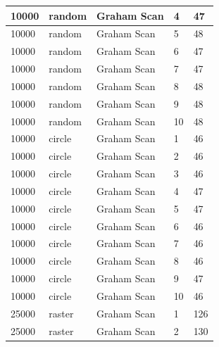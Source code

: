 \documentclass[12pt]{article}
\begin{document}
\begin{longtable}{|l|l|l|l|l|}
10000        & random            & Graham Scan & 4          & 47                            \\ \hline
10000        & random            & Graham Scan & 5          & 48                            \\ \hline
10000        & random            & Graham Scan & 6          & 47                            \\ \hline
10000        & random            & Graham Scan & 7          & 47                            \\ \hline
10000        & random            & Graham Scan & 8          & 48                            \\ \hline
10000        & random            & Graham Scan & 9          & 48                            \\ \hline
10000        & random            & Graham Scan & 10         & 48                            \\ \hline
10000        & circle            & Graham Scan & 1          & 46                            \\ \hline
10000        & circle            & Graham Scan & 2          & 46                            \\ \hline
10000        & circle            & Graham Scan & 3          & 46                            \\ \hline
10000        & circle            & Graham Scan & 4          & 47                            \\ \hline
10000        & circle            & Graham Scan & 5          & 47                            \\ \hline
10000        & circle            & Graham Scan & 6          & 46                            \\ \hline
10000        & circle            & Graham Scan & 7          & 46                            \\ \hline
10000        & circle            & Graham Scan & 8          & 46                            \\ \hline
10000        & circle            & Graham Scan & 9          & 47                            \\ \hline
10000        & circle            & Graham Scan & 10         & 46                            \\ \hline
25000        & raster            & Graham Scan & 1          & 126                           \\ \hline
25000        & raster            & Graham Scan & 2          & 130                           \\ \hline

\end{longtable}
\end{document}
